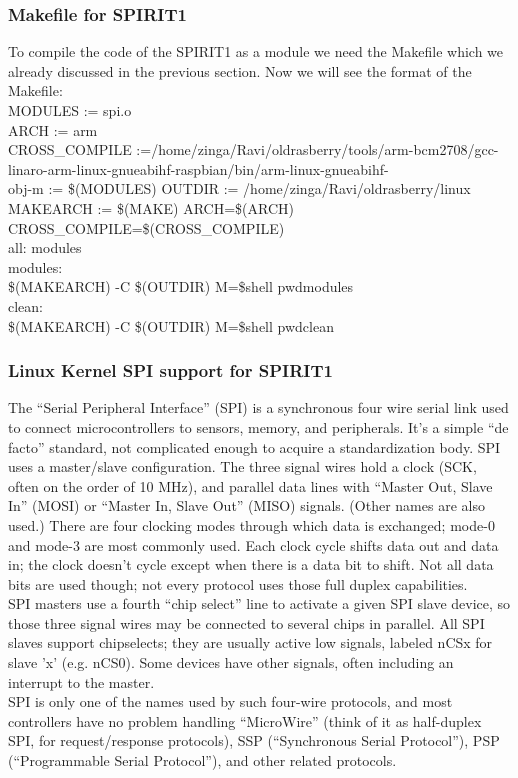 \subsubsection{Makefile for SPIRIT1}
To compile the code of the SPIRIT1 as a module we need the Makefile which we already discussed in the previous section. Now we will see the format of the Makefile:\\
MODULES := spi.o\\
ARCH := arm\\
CROSS\_COMPILE :=/home/zinga/Ravi/oldrasberry/tools/arm-bcm2708/gcc-linaro-arm-linux-gnueabihf-raspbian/bin/arm-linux-gnueabihf-\\
obj-m := \$(MODULES)
OUTDIR := /home/zinga/Ravi/oldrasberry/linux \\
MAKEARCH := \$(MAKE) ARCH=\$(ARCH) CROSS\_COMPILE=\$(CROSS\_COMPILE) \\
all: modules\\
modules:\\
\$(MAKEARCH) -C \$(OUTDIR) M=\$\lbrace shell pwd\rbrace modules\\
clean:\\
\$(MAKEARCH) -C \$(OUTDIR) M=\$\lbrace shell pwd\rbrace clean



\subsubsection{Linux Kernel SPI support for SPIRIT1}
The ``Serial Peripheral Interface'' (SPI) is a synchronous four wire serial link used to connect microcontrollers to sensors, memory, and peripherals.
It's a simple ``de facto'' standard, not complicated enough to acquire a standardization body.  SPI uses a master/slave configuration. The three signal wires hold a clock (SCK, often on the order of 10 MHz), and parallel data lines with ``Master Out, Slave In'' (MOSI) or ``Master In, Slave Out'' (MISO) signals.  (Other names are also used.)  There are four clocking modes through which data is exchanged; mode-0 and mode-3 are most commonly used.  Each clock cycle shifts data out and data in; the clock doesn't cycle except when there is a data bit to shift.  Not all data bits are used though; not every protocol uses those full duplex capabilities.\\

SPI masters use a fourth ``chip select'' line to activate a given SPI slave device, so those three signal wires may be connected to several chips
in parallel.  All SPI slaves support chipselects; they are usually active low signals, labeled nCSx for slave 'x' (e.g. nCS0).  Some devices have
other signals, often including an interrupt to the master.\\
SPI is only one of the names used by such four-wire protocols, and most controllers have no problem handling ``MicroWire'' (think of it as half-duplex SPI, for request/response protocols), SSP (``Synchronous Serial Protocol''), PSP (``Programmable Serial Protocol''), and other related protocols.
